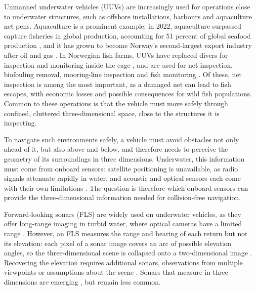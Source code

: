 Unmanned underwater vehicles (UUVs) are increasingly used for operations close to underwater structures, such as offshore installations, harbours and aquaculture net pens. Aquaculture is a prominent example: in 2022, aquaculture surpassed capture fisheries in global production, accounting for 51 percent of global seafood production \parencite{amundsen2025netpen}, and it has grown to become Norway's second-largest export industry after oil and gas \parencite{amundsen2024aquaculture}. In Norwegian fish farms, UUVs have replaced divers for inspection and monitoring inside the cage \parencite{amundsen2024aquaculture}, and are used for net inspection, biofouling removal, mooring-line inspection and fish monitoring \parencite{amundsen2025netpen}. Of these, net inspection is among the most important, as a damaged net can lead to fish escapes, with economic losses and possible consequences for wild fish populations. Common to these operations is that the vehicle must move safely through confined, cluttered three-dimensional space, close to the structures it is inspecting.

To navigate such environments safely, a vehicle must avoid obstacles not only ahead of it, but also above and below, and therefore needs to perceive the geometry of its surroundings in three dimensions. Underwater, this information must come from onboard sensors: satellite positioning is unavailable, as radio signals attenuate rapidly in water, and acoustic and optical sensors each come with their own limitations \parencite{paull2014auv}. The question is therefore which onboard sensors can provide the three-dimensional information needed for collision-free navigation.

Forward-looking sonars (FLS) are widely used on underwater vehicles, as they offer long-range imaging in turbid water, where optical cameras have a limited range \parencite{westman2020volumetric}. However, an FLS measures the range and bearing of each return but not its elevation: each pixel of a sonar image covers an arc of possible elevation angles, so the three-dimensional scene is collapsed onto a two-dimensional image \parencite{westman2020volumetric, mcconnell2020fusing}. Recovering the elevation requires additional sonars, observations from multiple viewpoints or assumptions about the scene \parencite{mcconnell2020fusing}. Sonars that measure in three dimensions are emerging \parencite{archieri2026insso3d}, but remain less common.

